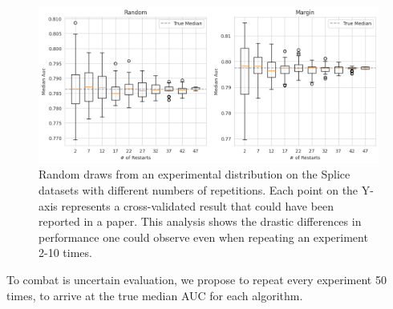 \documentclass[]{article}
\begin{document}
\begin{figure}
	\centering
	\includegraphics[width=\linewidth]{img/ablation_restarts.png}
	\caption{Random draws from an experimental distribution on the Splice datasets with different numbers of repetitions. Each point on the Y-axis represents a cross-validated result that could have been reported in a paper. This analysis shows the drastic differences in performance one could observe even when repeating an experiment 2-10 times.}
	\label{fig:restarts}
\end{figure}
To combat is uncertain evaluation, we propose to repeat every experiment 50 times, to arrive at the true median AUC for each algorithm.

\end{document}

